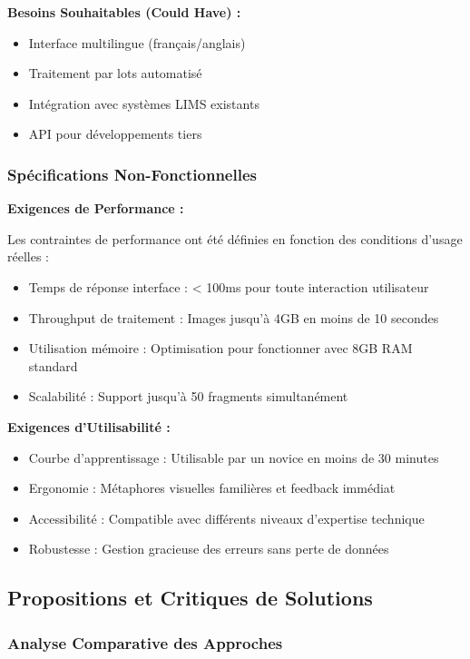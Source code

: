 \documentclass[12pt,a4paper]{article}
\begin{document}
\textbf{Besoins Souhaitables (Could Have) :}
\begin{itemize}
\item Interface multilingue (français/anglais)
\item Traitement par lots automatisé
\item Intégration avec systèmes LIMS existants
\item API pour développements tiers
\end{itemize}

\subsubsection{Spécifications Non-Fonctionnelles}

\textbf{Exigences de Performance :}

Les contraintes de performance ont été définies en fonction des conditions d'usage réelles :
\begin{itemize}
\item Temps de réponse interface : < 100ms pour toute interaction utilisateur
\item Throughput de traitement : Images jusqu'à 4GB en moins de 10 secondes
\item Utilisation mémoire : Optimisation pour fonctionner avec 8GB RAM standard
\item Scalabilité : Support jusqu'à 50 fragments simultanément
\end{itemize}

\textbf{Exigences d'Utilisabilité :}
\begin{itemize}
\item Courbe d'apprentissage : Utilisable par un novice en moins de 30 minutes
\item Ergonomie : Métaphores visuelles familières et feedback immédiat
\item Accessibilité : Compatible avec différents niveaux d'expertise technique
\item Robustesse : Gestion gracieuse des erreurs sans perte de données
\end{itemize}

\subsection{Propositions et Critiques de Solutions}

\subsubsection{Analyse Comparative des Approches}
\end{document}
